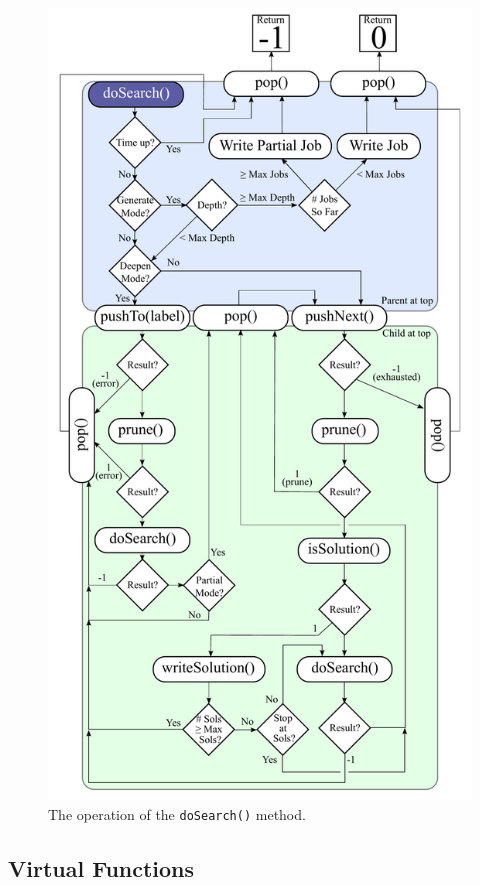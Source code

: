 \documentclass[11pt]{article}
\begin{document}
\begin{figure}[p]
	\centering
	\includegraphics[height=0.95\textheight]{figures/doSearchFlowchart.pdf}
	\caption{\label{fig:doSearch}The operation of the \texttt{doSearch()} method.}
\end{figure}

\subsection{Virtual Functions}
\end{document}

